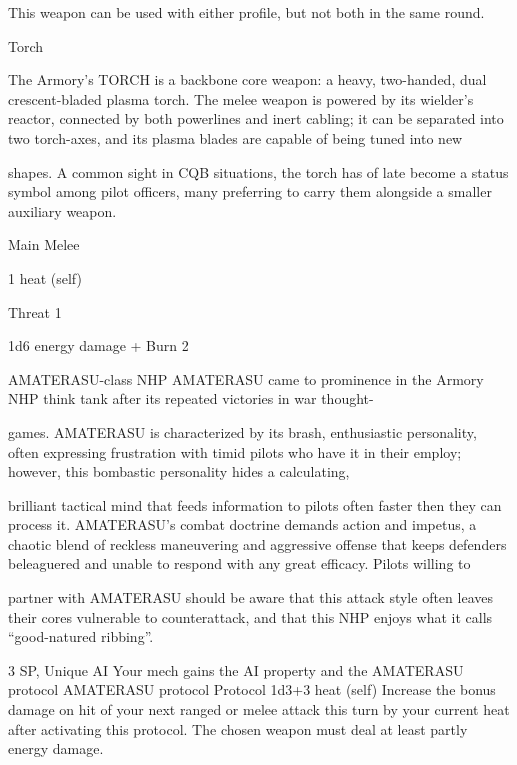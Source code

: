 This weapon can be used with either profile, but not both in the same round.
 

Torch  

The Armory’s TORCH is a backbone core weapon: a heavy, two-handed, dual crescent-bladed plasma  
torch. The melee weapon is powered by its wielder’s reactor, connected by both powerlines and inert  
cabling; it can be separated into two torch-axes, and its plasma blades are capable of being tuned into new  

shapes. A common sight in CQB situations, the torch has of late become a status symbol among pilot  
officers, many preferring to carry them alongside a smaller auxiliary weapon.    

Main Melee
 
1 heat (self)
 
Threat 1
 
1d6 energy damage + Burn 2
 

AMATERASU-class NHP  
AMATERASU came to prominence in the Armory NHP think tank after its repeated victories in war thought- 

games. AMATERASU is characterized by its brash, enthusiastic personality, often expressing frustration  
with timid pilots who have it in their employ; however, this bombastic personality hides a calculating,  

brilliant tactical mind that feeds information to pilots often faster then they can process it. AMATERASU’s  
combat doctrine demands action and impetus, a chaotic blend of reckless maneuvering and aggressive  
offense that keeps defenders beleaguered and unable to respond with any great efficacy. Pilots willing to  

partner with AMATERASU should be aware that this attack style often leaves their cores vulnerable to  
counterattack, and that this NHP enjoys what it calls “good-natured ribbing”.    

3 SP, Unique 
AI 
Your mech gains the AI property and the AMATERASU protocol 
	        AMATERASU protocol 
	        Protocol 
	        1d3+3 heat (self) 
         Increase the bonus damage on hit of your next ranged or melee attack this turn by your  
         current heat after activating this protocol. The chosen weapon must deal at least partly  
         energy damage. 
